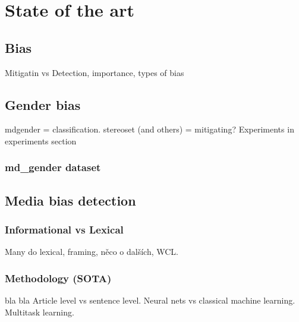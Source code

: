 \chapter{State of the art}

\section{Bias}
Mitigatin vs Detection, importance, types of bias
\section{Gender bias}
mdgender = classification. stereoset (and others) = mitigating?
Experiments in experiments section
\subsection{md\_gender dataset}
\section{Media bias detection}
\subsection{Informational vs Lexical}
Many do lexical, framing, něco o dalších, WCL.
\subsection{Methodology (SOTA)}\label{methodology}
bla bla Article level vs sentence level. Neural nets vs classical machine learning. Multitask learning.


